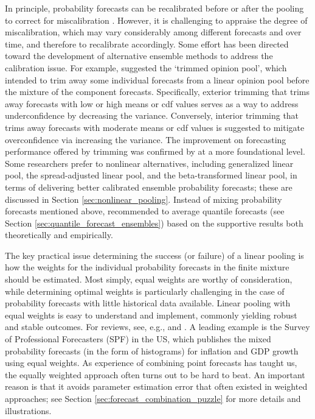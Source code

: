 \documentclass[11pt]{article}
\begin{document}
In principle, probability forecasts can be recalibrated before or after the pooling to correct for miscalibration \citep{Turner2014-za}. However, it is challenging to appraise the degree of miscalibration, which may vary considerably among different forecasts and over time, and therefore to recalibrate accordingly. Some effort has been directed toward the development of alternative ensemble methods to address the calibration issue. For example, \cite{Jose2014-uh} suggested the `trimmed opinion pool', which intended to trim away some individual forecasts from a linear opinion pool before the mixture of the component forecasts. Specifically, exterior trimming that trims away forecasts with low or high means or cdf values serves as a way to address underconfidence by decreasing the variance. Conversely, interior trimming that trims away forecasts with moderate means or cdf values is suggested to mitigate overconfidence via increasing the variance. The improvement on forecasting performance offered by trimming was confirmed by \cite{Grushka-Cockayne2017-dj} at a more foundational level. Some researchers prefer to nonlinear alternatives, including generalized linear pool, the spread-adjusted linear pool, and the beta-transformed linear pool, in terms of delivering better calibrated ensemble probability forecasts; these are discussed in Section \ref{sec:nonlinear_pooling}. Instead of mixing probability forecasts mentioned above, \cite{Lichtendahl2013-rt} recommended to average quantile forecasts (see Section \ref{sec:quantile_forecast_ensembles}) based on the supportive results both theoretically and empirically.

The key practical issue determining the success (or failure) of a linear pooling is how the weights for the individual probability forecasts in the finite mixture should be estimated. Most simply, equal weights are worthy of consideration, while determining optimal weights is particularly challenging in the case of probability forecasts with little historical data available. Linear pooling with equal weights is easy to understand and implement, commonly yielding robust and stable outcomes. For reviews, see, e.g., \cite{Wallis2005-yf} and \cite{OHagan2006-jk}. A leading example is the Survey of Professional Forecasters (SPF) in the US, which publishes the mixed probability forecasts (in the form of histograms) for inflation and GDP growth using equal weights. As experience of combining point forecasts has taught us, the equally weighted approach often turns out to be hard to beat. An important reason is that it avoids parameter estimation error that often existed in weighted approaches; see Section \ref{sec:forecast_combination_puzzle} for more details and illustrations.
\end{document}
